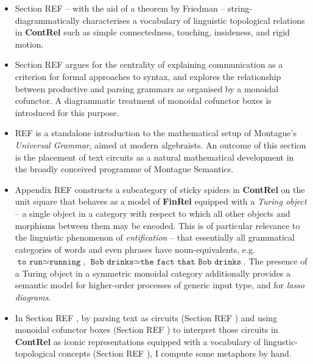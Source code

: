\begin{myboxB}
\begin{itemize}
\item Section \bR REF \e -- with the aid of a theorem by Friedman \citep{friedman_fom_2005} -- string-diagrammatically characterises a vocabulary of linguistic topological relations in \textbf{ContRel} such as simple connectedness, touching, insideness, and rigid motion.

\item Section \bR REF \e argues for the centrality of explaining communication as a criterion for formal approaches to syntax, and explores the relationship between productive and parsing grammars as organised by a monoidal cofunctor. A diagrammatic treatment of monoidal cofunctor boxes is introduced for this purpose.

\item \bR REF \e is a standalone introduction to the mathematical setup of Montague's \emph{Universal Grammar}, aimed at modern algebraists. An outcome of this section is the placement of text circuits as a natural mathematical development in the broadly conceived programme of Montague Semantics.

\item Appendix \bR REF \e constructs a subcategory of sticky spiders in \textbf{ContRel} on the unit square that behaves as a model of \textbf{FinRel} equipped with a \emph{Turing object} -- a single object in a category with respect to which all other objects and morphisms between them may be encoded. This is of particular relevance to the linguistic phenomenon of \emph{entification} -- that essentially all grammatical categories of words and even phrases have noun-equivalents, e.g. $\texttt{to run} \simeq \texttt{running}$, $\texttt{Bob drinks} \simeq \texttt{the fact that Bob drinks}$. The presence of a Turing object in a symmetric monoidal category additionally provides a semantic model for higher-order processes of generic input type, and for \emph{lasso diagrams}.

\item In Section \bR REF \e, by parsing text as circuits (Section \bR REF \e) and using monoidal cofunctor boxes (Section \bR REF \e) to interpret those circuits in \textbf{ContRel} as iconic representations equipped with a vocabulary of lingustic-topological concepts (Section \bR REF \e), I compute some metaphors by hand.

\end{itemize}
\end{myboxB}
\vfill
\clearpage
\newpage

\setcounter{chapter}{-1}
